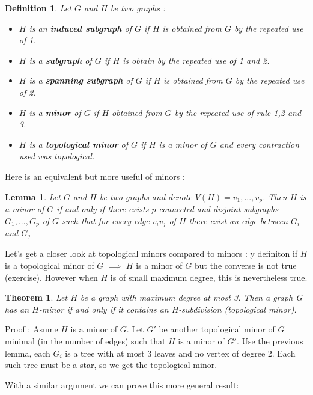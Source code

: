 \documentclass[12pt,a4paper]{article}
\newtheorem{theorem}{Theorem}
\newtheorem{lemma}{Lemma}
\newtheorem{definition}{Definition}
\begin{document}
\begin{definition}
Let $G$ and $H$ be two graphs :
\begin{itemize}
\item $H$ is an \textbf{induced subgraph} of $G$ if $H$ is obtained from $G$ by the repeated use of 1.
\item $H$ is a \textbf{subgraph }of $G$ if $H$ is obtain by the repeated use of 1 and 2.
\item $H$ is a \textbf{spanning subgraph} of $G$ if $H$ is obtained from $G$ by the repeated use of 2.
\item $H$ is a \textbf{minor} of $G$ if $H$ obtained from $G$ by the repeated use of rule 1,2 and 3.
\item $H$ is a \textbf{topological minor}  of $G$ if $H$ is a minor of $G$ and every contraction used was topological.
\end{itemize}
\end{definition}

Here is an equivalent but more useful of minors :

\begin{lemma}
Let $G$ and $H$ be two graphs and denote $V(H) = {v_1 , ... , v_p}$. Then $H$ is a minor of $G$ if and only if there exists $p$ connected and disjoint subgraphs $G_1, ... , G_p$ of $G$ such that for every edge $v_iv_j$ of $H$ there exist an edge between $G_i$ and $G_j$
\end{lemma}


Let's get a closer look at topological minors compared to minors : y definiton if $H$ is a topological minor of $G$ $\implies$ $H$ is a minor of $G$ but the converse is not true (exercise). However when $H$ is of small maximum degree, this is nevertheless true.

\begin{theorem}
Let $H$ be a graph with maximum degree at most 3. Then a graph G has an $H$-minor if and only if it contains an $H$-subdivision (topological minor).
\end{theorem}

Proof : Asume $H$ is a minor of $G$. Let $G'$ be another topological minor of $G$ minimal (in the number of edges) such that $H$ is a minor of $G'$. Use the previous lemma, each $G_i$ is a tree with at most 3 leaves and no vertex of degree 2. Each such tree must be a star, so we get the topological minor.


With a similar argument we can prove this more general result:
\end{document}
